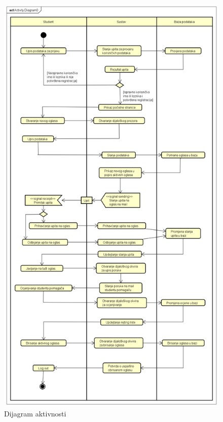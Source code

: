 			\begin{figure}[H]
				\includegraphics[scale=0.42]{dijagrami/DijagramAktivnosti.png}
				\centering
				\caption{Dijagram aktivnosti}
				\label{fig:dijagram aktivnosti}
			\end{figure}
			
			\eject
			
